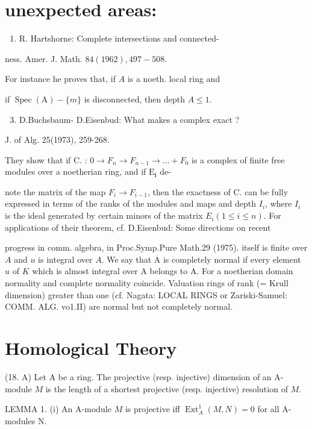 \section{unexpected areas:}
\begin{enumerate}
  \item R. Hartshorne: Complete intersections and connected-
\end{enumerate}
ness. Amer. J. Math. $84(1962), 497-508 .$

For instance he proves that, if $A$ is a noeth. local ring and

if $\operatorname{Spec}(\mathrm{A})-\{m\}$ is disconnected, then depth $A \leqslant 1$.

\begin{enumerate}
  \setcounter{enumi}{2}
  \item D.Buchsbaum- D.Eisenbud: What makes a complex exact ?
\end{enumerate}
J. of Alg. 25(1973), 259-268.

They show that if C. : $0 \rightarrow F_{n} \rightarrow F_{n-1} \rightarrow \ldots+F_{0}$ is a complex of finite free modules over a noetherian ring, and if $\mathrm{E}_{\mathbf{i}}$ de-

note the matrix of the map $F_{i} \rightarrow F_{i-1}$, then the exactness of C. can be fully expressed in terms of the ranks of the modules and maps and depth $I_{i}$, where $I_{i}$ is the ideal generated by certain minors of the matrix $E_{i}(1 \leqslant i \leqslant n)$. For applications of their theorem, cf. D.Eisenbud: Some directions on recent

progress in comm. algebra, in Proc.Symp.Pure Math.29 (1975). itself is finite over $A$ and $u$ is integral over $A$. We say that A is completely normal if every element $u$ of $K$ which is almost integral over A belongs to A. For a noetherian domain normality and complete normality coincide. Valuation rings of rank (= Krull dimension) greater than one (cf. Nagata: LOCAL RINGS or Zariski-Samuel: COMM. ALG. vo1.II) are normal but not completely normal.



\section{Homological Theory}
(18. A) Let A be a ring. The projective (resp. injective) dimension of an A-module $M$ is the length of a shortest projective (resp. injective) resolution of $M$.

LEMMA 1. (i) An A-module $M$ is projective iff $\operatorname{Ext}_{A}^{1}(M, N)=0$ for all A-modules $\mathrm{N}$.

